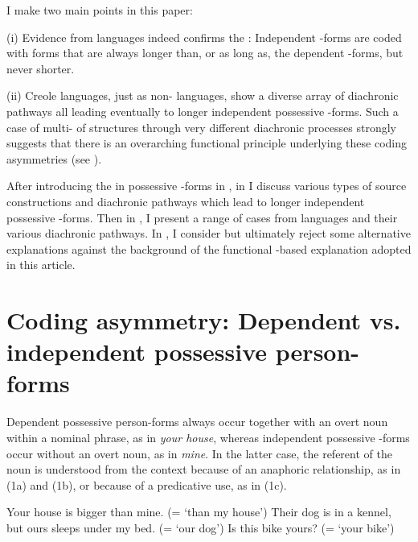 \documentclass[output=paper]{langsci/langscibook}
\begin{document}
I make two main points in this paper:

(i) Evidence from  languages indeed confirms the : Independent -forms are coded with forms that are always longer than, or as long as, the dependent -forms, but never shorter.

(ii) Creole languages, just as non- languages, show a diverse array of diachronic pathways all leading eventually to longer independent possessive -forms. Such a case of multi- of structures through very different diachronic processes strongly suggests that there is an overarching functional  principle underlying these coding asymmetries (see ). 

After introducing the  in possessive -forms in , in  I discuss various types of source constructions and diachronic pathways which lead to longer independent possessive -forms. Then in , I present a range of cases from  languages and their various diachronic pathways. In , I consider but ultimately reject some alternative explanations against the background of the functional -based explanation adopted in this article. 

\section{Coding asymmetry: Dependent vs. independent possessive {person}-forms}\label{sec:michaelis:2} 

Dependent possessive per\-son-forms always occur together with an overt noun within a nominal phrase, as in \textit{your house}, whereas independent possessive -forms occur without an overt noun, as in \textit{mine}. In the latter case, the referent of the noun is understood from the context because of an anaphoric relationship, as in (1a) and (1b), or because of a predicative use, as in (1c).  

\ea
{}
\ea
Your house is bigger than mine. (= ‘than my house’)
\ex
 Their dog is in a kennel, but ours sleeps under my bed. (= ‘our dog’)
\ex 
 Is this bike yours? (= ‘your bike’)
\z
\z
\end{document}

